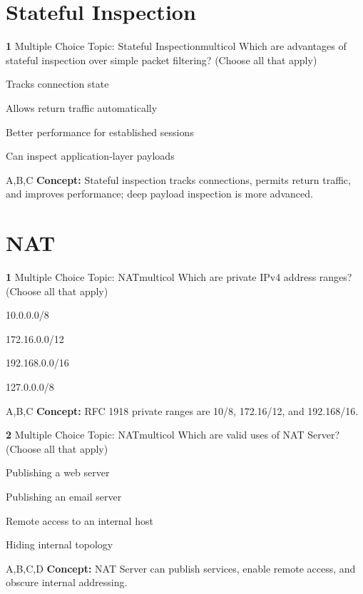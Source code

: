 \documentclass[10pt,a4paper]{article}
\begin{document}
\section{Stateful Inspection}
\begin{qcard}{\color{white}\textbf{1} \hfill \small Multiple Choice \textbar{} Topic: Stateful Inspection}{multicol}
Which are advantages of stateful inspection over simple packet filtering? (Choose all that apply)

\begin{qoptions}
\item Tracks connection state
\item Allows return traffic automatically
\item Better performance for established sessions
\item Can inspect application-layer payloads
\end{qoptions}
\begin{explainbox}{A,B,C}
\textbf{Concept:} Stateful inspection tracks connections, permits return traffic, and improves performance; deep payload inspection is more advanced.
\end{explainbox}
\end{qcard}

\section{NAT}
\begin{qcard}{\color{white}\textbf{1} \hfill \small Multiple Choice \textbar{} Topic: NAT}{multicol}
Which are private IPv4 address ranges? (Choose all that apply)

\begin{qoptions}
\item 10.0.0.0/8
\item 172.16.0.0/12
\item 192.168.0.0/16
\item 127.0.0.0/8
\end{qoptions}
\begin{explainbox}{A,B,C}
\textbf{Concept:} RFC 1918 private ranges are 10/8, 172.16/12, and 192.168/16.
\end{explainbox}
\end{qcard}

\begin{qcard}{\color{white}\textbf{2} \hfill \small Multiple Choice \textbar{} Topic: NAT}{multicol}
Which are valid uses of NAT Server? (Choose all that apply)

\begin{qoptions}
\item Publishing a web server
\item Publishing an email server
\item Remote access to an internal host
\item Hiding internal topology
\end{qoptions}
\begin{explainbox}{A,B,C,D}
\textbf{Concept:} NAT Server can publish services, enable remote access, and obscure internal addressing.
\end{explainbox}
\end{qcard}
\end{document}
